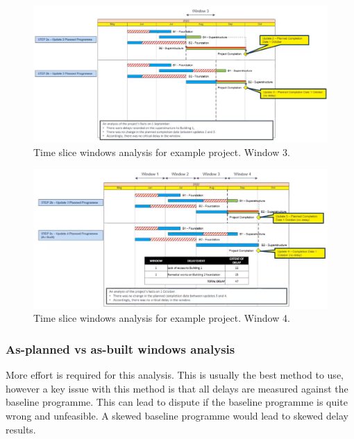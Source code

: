 \begin{figure}[H]
    \centering
    \includegraphics[width = \textwidth]{img/figure35.png}
    \caption{Time slice windows analysis for example project. Window 3.}
\end{figure}
\begin{figure}[H]
    \centering
    \includegraphics[width = \textwidth]{img/figure36.png}
    \caption{Time slice windows analysis for example project. Window 4.}
\end{figure}
\subsubsection{As-planned vs as-built windows analysis}
More effort is required for this analysis. This is usually the best method to use, however a key issue with this method is that all delays are measured against the baseline programme. This can lead to dispute if the baseline programme is quite wrong and unfeasible. A skewed baseline programme would lead to skewed delay results.

